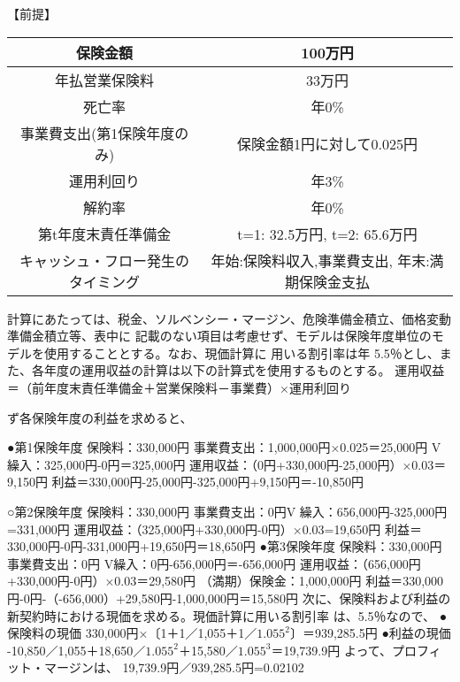\documentclass[report,gutter=10mm,fore-edge=10mm,uplatex,dvipdfmx]{jlreq}
\begin{document}
【前提】

\begin{tabular}{|c|c|}
\hline 保険金額& 100万円\\ \hline
 年払営業保険料& 33万円\\ \hline
 死亡率&年0\%\\ \hline
 事業費支出(第1保険年度のみ)&保険金額1円に対して0.025円\\ \hline
 運用利回り&年3\%\\ \hline
 解約率&年0\%\\ \hline
 第t年度末責任準備金&t=1: 32.5万円, t=2: 65.6万円\\ \hline
キャッシュ・フロー発生のタイミング &年始:保険料収入,事業費支出, 年末:満期保険金支払 \\ \hline
\end{tabular}

計算にあたっては、税金、ソルベンシー・マージン、危険準備金積立、価格変動準備金積立等、表中に
記載のない項目は考慮せず、モデルは保険年度単位のモデルを使用することとする。なお、現価計算に
用いる割引率は年 5.5％とし、また、各年度の運用収益の計算は以下の計算式を使用するものとする。
運用収益＝（前年度末責任準備金＋営業保険料－事業費）×運用利回り

\answer{}
ず各保険年度の利益を求めると、

●第1保険年度
保険料：330,000円
事業費支出：1,000,000円×0.025＝25,000円
V繰入：325,000円-0円＝325,000円
運用収益：（0円+330,000円-25,000円）×0.03＝9,150円
利益＝330,000円-25,000円-325,000円+9,150円＝-10,850円

○第2保険年度 
保険料：330,000円
事業費支出：0円V
繰入：656,000円-325,000円=331,000円
運用収益：（325,000円+330,000円-0円）×0.03=19,650円
利益＝330,000円-0円-331,000円+19,650円＝18,650円
●第3保険年度
保険料：330,000円
事業費支出：0円
V繰入：0円-656,000円＝-656,000円
運用収益：（656,000円+330,000円-0円）×0.03＝29,580円
（満期）保険金：1,000,000円
利益＝330,000円-0円-（-656,000）+29,580円-1,000,000円＝15,580円
次に、保険料および利益の新契約時における現価を求める。現価計算に用いる割引率
は、5.5％なので、
●保険料の現価
330,000円×〔1＋1／1,055＋1／$1.055^2$〕＝939,285.5円
●利益の現価
-10,850／1,055＋18,650／$1.055^2$＋15,580／$1.055^3$＝19,739.9円
よって、プロフィット・マージンは、
19,739.9円／939,285.5円=0.02102
\end{document}
